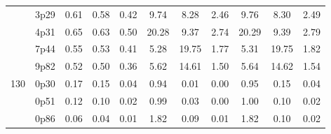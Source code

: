 \documentclass[12pt,A4paper]{article}
\begin{document}
\begin{table}[]
\begin{tabular}{lllllllllll}
\multicolumn{1}{|l|}{} & \multicolumn{1}{l|}{3p29} & \multicolumn{1}{c|}{0.61}        & \multicolumn{1}{c|}{0.58}         & \multicolumn{1}{c|}{0.42}        & \multicolumn{1}{c|}{9.74}         & \multicolumn{1}{c|}{8.28}        & \multicolumn{1}{c|}{2.46}        & \multicolumn{1}{c|}{9.76}        & \multicolumn{1}{c|}{8.30}        & \multicolumn{1}{c|}{2.49}         \\ \cline{2-11}
\multicolumn{1}{|l|}{} & \multicolumn{1}{l|}{4p31} & \multicolumn{1}{c|}{0.65}        & \multicolumn{1}{c|}{0.63}         & \multicolumn{1}{c|}{0.50}        & \multicolumn{1}{c|}{20.28}         & \multicolumn{1}{c|}{9.37}        & \multicolumn{1}{c|}{2.74}        & \multicolumn{1}{c|}{20.29}        & \multicolumn{1}{c|}{9.39}        & \multicolumn{1}{c|}{2.79}         \\ \cline{2-11}
\multicolumn{1}{|l|}{} & \multicolumn{1}{l|}{7p44} & \multicolumn{1}{c|}{0.55}        & \multicolumn{1}{c|}{0.53}         & \multicolumn{1}{c|}{0.41}        & \multicolumn{1}{c|}{5.28}         & \multicolumn{1}{c|}{19.75}        & \multicolumn{1}{c|}{1.77}        & \multicolumn{1}{c|}{5.31}        & \multicolumn{1}{c|}{19.75}        & \multicolumn{1}{c|}{1.82}         \\ \cline{2-11}
\multicolumn{1}{|l|}{} & \multicolumn{1}{l|}{9p82} & \multicolumn{1}{c|}{0.52}        & \multicolumn{1}{c|}{0.50}         & \multicolumn{1}{c|}{0.36}        & \multicolumn{1}{c|}{5.62}         & \multicolumn{1}{c|}{14.61}        & \multicolumn{1}{c|}{1.50}        & \multicolumn{1}{c|}{5.64}        & \multicolumn{1}{c|}{14.62}        & \multicolumn{1}{c|}{1.54}         \\ \hline
\multicolumn{1}{|l|}{\multirow{11}{*}{130}} & \multicolumn{1}{l|}{0p30} & \multicolumn{1}{c|}{0.17}        & \multicolumn{1}{c|}{0.15}         & \multicolumn{1}{c|}{0.04}        & \multicolumn{1}{c|}{0.94}         & \multicolumn{1}{c|}{0.01}        & \multicolumn{1}{c|}{0.00}         & \multicolumn{1}{c|}{0.95}         & \multicolumn{1}{c|}{0.15}         & \multicolumn{1}{c|}{0.04}         \\ \cline{2-11} 
\multicolumn{1}{|l|}{} & \multicolumn{1}{l|}{0p51} & \multicolumn{1}{c|}{0.12}        & \multicolumn{1}{c|}{0.10}         & \multicolumn{1}{c|}{0.02}        & \multicolumn{1}{c|}{0.99}         & \multicolumn{1}{c|}{0.03}        & \multicolumn{1}{c|}{0.00}        & \multicolumn{1}{c|}{1.00}        & \multicolumn{1}{c|}{0.10}        & \multicolumn{1}{c|}{0.02}         \\ \cline{2-11}
\multicolumn{1}{|l|}{} & \multicolumn{1}{l|}{0p86} & \multicolumn{1}{c|}{0.06}        & \multicolumn{1}{c|}{0.04}         & \multicolumn{1}{c|}{0.01}        & \multicolumn{1}{c|}{1.82}         & \multicolumn{1}{c|}{0.09}        & \multicolumn{1}{c|}{0.01}        & \multicolumn{1}{c|}{1.82}        & \multicolumn{1}{c|}{0.10}        & \multicolumn{1}{c|}{0.02}         \\ \cline{2-11}

\end{tabular}
\end{table}
\end{document}
